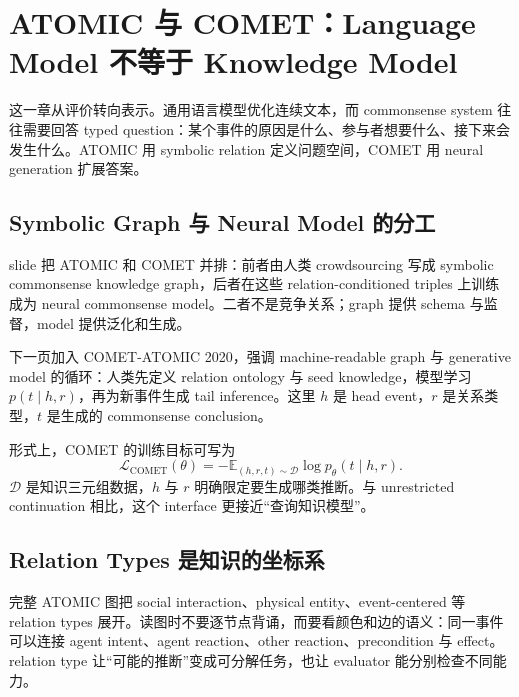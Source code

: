 \section{ATOMIC 与 COMET：Language Model 不等于 Knowledge Model}

这一章从评价转向表示。通用语言模型优化连续文本，而 commonsense system 往往需要回答 typed question：某个事件的原因是什么、参与者想要什么、接下来会发生什么。ATOMIC 用 symbolic relation 定义问题空间，COMET 用 neural generation 扩展答案。

\subsection{Symbolic Graph 与 Neural Model 的分工}

slide 把 ATOMIC 和 COMET 并排：前者由人类 crowdsourcing 写成 symbolic commonsense knowledge graph，后者在这些 relation-conditioned triples 上训练成为 neural commonsense model。二者不是竞争关系；graph 提供 schema 与监督，model 提供泛化和生成。


下一页加入 COMET-ATOMIC 2020，强调 machine-readable graph 与 generative model 的循环：人类先定义 relation ontology 与 seed knowledge，模型学习 $p(t\mid h,r)$，再为新事件生成 tail inference。这里 $h$ 是 head event，$r$ 是关系类型，$t$ 是生成的 commonsense conclusion。


形式上，COMET 的训练目标可写为
\begin{equation}
\mathcal{L}_{\mathrm{COMET}}(\theta)
=-\mathbb{E}_{(h,r,t)\sim\mathcal{D}}
\log p_{\theta}(t\mid h,r).
\end{equation}
$\mathcal{D}$ 是知识三元组数据，$h$ 与 $r$ 明确限定要生成哪类推断。与 unrestricted continuation 相比，这个 interface 更接近“查询知识模型”。

\subsection{Relation Types 是知识的坐标系}

完整 ATOMIC 图把 social interaction、physical entity、event-centered 等 relation types 展开。读图时不要逐节点背诵，而要看颜色和边的语义：同一事件可以连接 agent intent、agent reaction、other reaction、precondition 与 effect。relation type 让“可能的推断”变成可分解任务，也让 evaluator 能分别检查不同能力。

